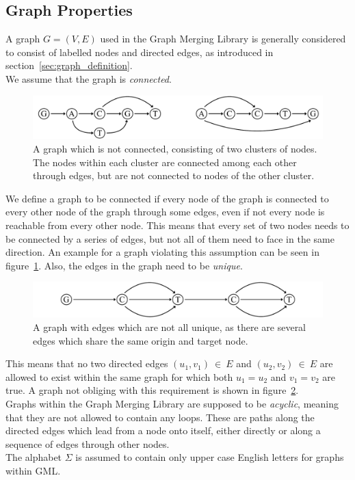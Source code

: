 \documentclass[a4paper,12pt,twoside,BCOR=10mm]{scrbook}
\begin{document}
\subsection{Graph Properties}

A graph $ G = (V, E) $ used in the Graph Merging Library is generally considered to consist of labelled nodes
and directed edges, as introduced in section~\ref{sec:graph_definition}. \\
We assume that the graph is \textit{connected}.
\begin{figure}[!htb]
\centering
\includegraphics[width=\textwidth]{evo_fig_assume_connectedness.pdf}
\caption[Graph which is not connected]{A graph which is not connected, consisting of two clusters of nodes. The nodes within each cluster are connected among each other through edges, but are not connected to nodes of the other cluster.} \label{fig:evo_fig_assume_connectedness}
\end{figure}
We define a graph to be connected if every node of the graph is connected to every other node of the graph through some edges,
even if not every node is reachable from every other node. This means that every
set of two nodes needs to be connected by a series of edges, but not all of them need to face in the same direction.
An example for a graph violating this assumption can be seen in figure~\ref{fig:evo_fig_assume_connectedness}.
Also, the edges in the graph need to be \textit{unique}.
\begin{figure}[!htb]
\centering
\includegraphics[width=\textwidth]{evo_fig_assume_unique_edges.pdf}
\caption[Graph with edges which are not unique]{A graph with edges which are not all unique, as there are several edges which share the same origin and target node.} \label{fig:evo_fig_assume_unique_edges}
\end{figure}
This means that no two directed edges $ (u_1, v_1) {\: \in \:} E $ and $ (u_2, v_2) {\: \in \:} E $ are allowed to
exist within the same graph for which both $ u_1 = u_2 $ and $ v_1 = v_2 $ are true.
A graph not obliging with this requirement is shown in figure~\ref{fig:evo_fig_assume_unique_edges}. \\
Graphs within the Graph Merging Library are supposed to be \textit{acyclic},
meaning that they are not allowed to contain any loops. These are paths along
the directed edges which lead from a node onto itself, either directly or along a sequence of edges through other nodes. \\
The alphabet $ \Sigma $ is assumed to contain only upper case English letters for graphs within GML.
\end{document}
